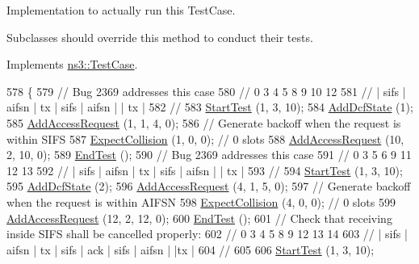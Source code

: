 Implementation to actually run this Test\+Case. 

Subclasses should override this method to conduct their tests. 

Implements \hyperlink{classns3_1_1TestCase_a8ff74680cf017ed42011e4be51917a24}{ns3\+::\+Test\+Case}.


\begin{DoxyCode}
578 \{
579   \textcolor{comment}{// Bug 2369 addresses this case}
580   \textcolor{comment}{//  0      3       4    5      8       9  10   12}
581   \textcolor{comment}{//  | sifs | aifsn | tx | sifs | aifsn |   | tx |}
582   \textcolor{comment}{//}
583   \hyperlink{classDcfManagerTest_a5e7a2ff4209e9602aea95d4efa51ae91}{StartTest} (1, 3, 10);
584   \hyperlink{classDcfManagerTest_ab48a072efc828fc250036b45c3db1832}{AddDcfState} (1);
585   \hyperlink{classDcfManagerTest_a1f016026b88c036eed9ce87bfc32b71a}{AddAccessRequest} (1, 1, 4, 0);
586   \textcolor{comment}{// Generate backoff when the request is within SIFS}
587   \hyperlink{classDcfManagerTest_a1f78350a941a4ca0e28260c8f6390e45}{ExpectCollision} (1, 0, 0); \textcolor{comment}{// 0 slots}
588   \hyperlink{classDcfManagerTest_a1f016026b88c036eed9ce87bfc32b71a}{AddAccessRequest} (10, 2, 10, 0);
589   \hyperlink{classDcfManagerTest_acc78df96a60d77fdb57a9f93029dca6c}{EndTest} ();
590   \textcolor{comment}{// Bug 2369 addresses this case}
591   \textcolor{comment}{//  0      3       5    6      9       11  12   13}
592   \textcolor{comment}{//  | sifs | aifsn | tx | sifs | aifsn |   | tx |}
593   \textcolor{comment}{//}
594   \hyperlink{classDcfManagerTest_a5e7a2ff4209e9602aea95d4efa51ae91}{StartTest} (1, 3, 10);
595   \hyperlink{classDcfManagerTest_ab48a072efc828fc250036b45c3db1832}{AddDcfState} (2);
596   \hyperlink{classDcfManagerTest_a1f016026b88c036eed9ce87bfc32b71a}{AddAccessRequest} (4, 1, 5, 0);
597   \textcolor{comment}{// Generate backoff when the request is within AIFSN}
598   \hyperlink{classDcfManagerTest_a1f78350a941a4ca0e28260c8f6390e45}{ExpectCollision} (4, 0, 0); \textcolor{comment}{// 0 slots}
599   \hyperlink{classDcfManagerTest_a1f016026b88c036eed9ce87bfc32b71a}{AddAccessRequest} (12, 2, 12, 0);
600   \hyperlink{classDcfManagerTest_acc78df96a60d77fdb57a9f93029dca6c}{EndTest} ();
601   \textcolor{comment}{// Check that receiving inside SIFS shall be cancelled properly:}
602   \textcolor{comment}{//  0      3       4    5      8     9     12       13 14}
603   \textcolor{comment}{//  | sifs | aifsn | tx | sifs | ack | sifs | aifsn |  |tx |}
604   \textcolor{comment}{//}
605 
606   \hyperlink{classDcfManagerTest_a5e7a2ff4209e9602aea95d4efa51ae91}{StartTest} (1, 3, 10);

\end{DoxyCode}
